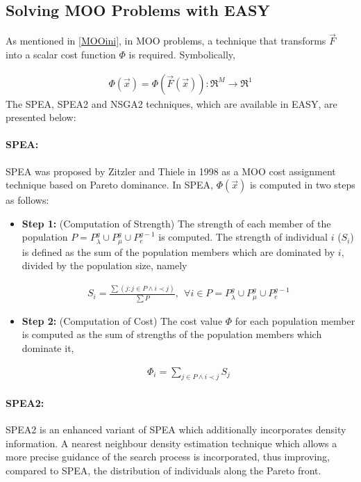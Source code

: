 \subsection{Solving MOO Problems with EASY}
\label{MOO}
As mentioned in \ref{MOOini}, in MOO problems, a technique that transforms $\vec{F}$ into a scalar cost function $\Phi$ is required. Symbolically,

\begin{eqnarray}
    \Phi(\vec{x})=\Phi(\vec{F}(\vec{x})) :\Re ^M \rightarrow \Re ^1 
	\label{MOOeq}
\end{eqnarray}
The SPEA, SPEA2 and NSGA2 techniques, which are available in EASY, are presented below:

\paragraph{SPEA:}
SPEA was proposed by Zitzler and Thiele \cite{ZiTh98} in 1998 as a MOO cost assignment technique based on Pareto dominance. In SPEA, $\Phi(\vec{x})$ is computed in two steps as follows:
\begin{itemize}

\item[]{\bf Step 1:}  (Computation of Strength) The strength of each member of the population $P=P_{\lambda}^g \cup P_{\mu}^g \cup P_{e}^{g-1}$ is computed. The strength of individual $i$ ($S_i$) is defined as the sum of the population members which are dominated  by $i$, divided by the population size, namely 

\begin{eqnarray}
	S_i = \frac{\sum(j : j \in P \wedge i \prec j)} {\sum P}, ~~ \forall i \in P =P_{\lambda}^g \cup P_{\mu}^g \cup P_{e}^{g-1}  
\end{eqnarray}

\item[]{\bf Step 2:}  (Computation of Cost) The cost value $\Phi$ for each population member is computed as the sum of strengths of the population members which dominate it,

\begin{eqnarray}
	\Phi_i = \sum _{j \in P \wedge i \prec j}S_j
\end{eqnarray}
\end{itemize}
  
 
\paragraph{SPEA2:}
SPEA2 \cite{Zitz02} is an enhanced variant of SPEA which additionally incorporates density information. A nearest neighbour density estimation technique which allows a more precise guidance of the search process is incorporated, thus improving, compared to SPEA, the distribution of individuals along the Pareto front. 

